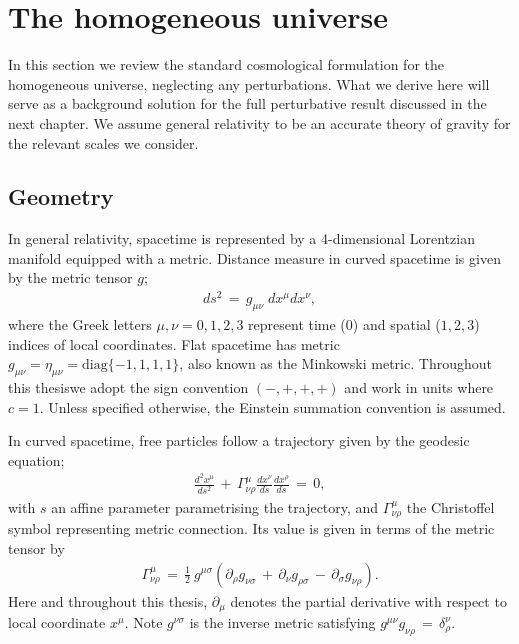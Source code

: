 \documentclass[a4paper,12pt,times,custombib,print,index]{Classes/PhDThesisPSnPDF} %
\providecommand{\DIFadd}[1]{{\protect\color{blue}\uwave{#1}}} %
\providecommand{\DIFaddbegin}{} %
\providecommand{\DIFaddend}{} %
\newcommand{\DIFaddincludegraphics}[2][]{{\color{blue}\fbox{\DIFOincludegraphics[#1]{#2}}}} %
\DeclareRobustCommand{\DIFaddbegin}{\DIFOaddbegin \let\includegraphics\DIFaddincludegraphics} %
\DeclareRobustCommand{\DIFaddend}{\DIFOaddend \let\includegraphics\DIFOincludegraphics} %
\begin{document}
\section{The homogeneous universe}

In this section we review the standard cosmological formulation for the homogeneous universe, neglecting any perturbations. What we derive here will serve as a background solution for the full perturbative result discussed in the next chapter. We assume general relativity to be an accurate theory of gravity for the relevant scales we consider.

\subsection{Geometry}

In general relativity, spacetime is represented by a 4-dimensional Lorentzian manifold equipped with a metric. Distance measure in curved spacetime is given by the metric tensor $g$;
\begin{align}
	ds^2 \,=\, g_{\mu \nu} \; dx^\mu dx^\nu	,
\end{align}
where the Greek letters $\mu, \nu = 0,1,2,3$ represent time ($0$) and spatial ($1,2,3$) indices of local coordinates. Flat spacetime has metric $g_{\mu\nu} = \eta_{\mu\nu} = \text{diag}\{-1, 1, 1, 1\}$, also known as the Minkowski metric. Throughout this thesis\DIFaddbegin \DIFadd{, }\DIFaddend we adopt the sign convention $(-, +, +, +)$ and work in units where $c=1$. Unless specified otherwise, the Einstein summation convention is assumed. 

In curved spacetime, free particles follow a trajectory given by the geodesic equation;
\begin{align}
	\frac{d^2x^\mu}{ds^2} \,+\, \Gamma^\mu_{\nu \rho} \frac{dx^\nu}{ds} \frac{dx^\rho}{ds} \,=\, 0,  \label{eqn:geodesic}
\end{align}
with $s$ an affine parameter parametrising the trajectory, and $\Gamma^\mu_{\nu\rho}$ the Christoffel symbol representing \DIFaddbegin \DIFadd{the }\DIFaddend metric connection. Its value is given in terms of the metric tensor by
\begin{align}
	\Gamma^{\mu}_{\nu\rho} \,=\, \frac{1}{2}~ g^{\mu\sigma} \left( \partial_\rho g_{\nu\sigma} \,+\, \partial_\nu g_{\rho\sigma} \,-\, \partial_\sigma g_{\nu\rho}  \right). \label{def:Levi_Civita}
\end{align}
Here and throughout this thesis, $\partial_\mu$ denotes the partial derivative with respect to local coordinate $x^\mu$. Note $g^{\nu\sigma}$ is the inverse metric satisfying $g^{\mu\nu} g_{\nu\rho} \,=\, \delta^\nu_\rho$.
\end{document}
